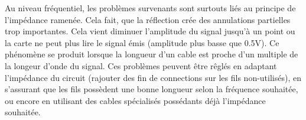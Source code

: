  Au niveau fréquentiel, les problèmes survenants sont surtouts liés au principe de l'impédance ramenée. Cela fait, que la réflection crée des annulations
 partielles trop importantes. Cela vient diminuer l'amplitude du signal jusqu'à un point ou la carte ne peut plus lire le signal émis (amplitude
 plus basse que 0.5V). Ce phénomène se produit lorsque la longueur d'un cable est proche d'un multiple de la longeur d'onde du signal.
 Ces problèmes peuvent être rêglés en adaptant l'impédance du circuit (rajouter des fin de connections sur les fils non-utilisés), en s'assurant
 que les fils possèdent une bonne longueur selon la fréquence souhaitée, ou encore en utilisant des cables spécialisés possédants déjà l'impédance
 souhaitée.
